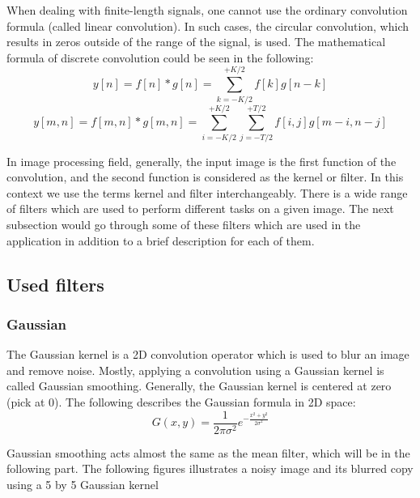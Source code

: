 \documentclass{article}
\begin{document}
			
			When dealing with finite-length signals, one cannot use the ordinary convolution formula (called linear convolution).
			In such cases, the circular convolution, which results in zeros outside of the range of the signal, is used. The mathematical formula of discrete 
			convolution could be seen in the following:
			\begin{equation}
			y[n] = f[n]*g[n] = \sum_{k=-K/2}^{+K/2} f[k]g[n-k]
			\end{equation}
			\begin{equation}
			y[m,n] = f[m,n]*g[m,n] = \sum_{i=-K/2}^{+K/2}\sum_{j=-T/2}^{+T/2}f[i,j]g[m-i,n-j]
			\end{equation}


			
			
			In image processing field, generally, the input image is the first function of the convolution, and the second 
			function is considered as the kernel or filter.
			In this context we use the terms kernel and filter interchangeably.
			There is a wide range of filters which are used to perform different tasks on a given image. The next subsection would go through some of these 
			filters which are used in the application in addition to a brief description for each of them.

		\subsection{Used filters}
		
		\subsubsection{Gaussian}

			The Gaussian kernel is a 2D convolution operator which is used to blur an image and remove noise. Mostly, applying a convolution using a Gaussian
			kernel is called Gaussian smoothing. Generally, the Gaussian kernel is centered at
			zero (pick at 0). The following describes the Gaussian formula in 2D space:
\begin{equation}
			G(x,y) = \frac{1}{2\pi\sigma^{2}}e^{-\frac{x^{2}+y^{2}}{2\sigma^{2}}}
\end{equation}
			
			Gaussian smoothing acts almost the same as the mean filter, which will be in the following part. The following figures illustrates a noisy image and its blurred copy using a 5 by 5 Gaussian kernel
\end{document}
